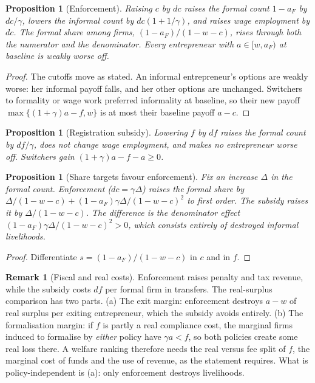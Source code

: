 \documentclass[11pt]{article}
\newtheorem{proposition}[theorem]{Proposition}
\theoremstyle{definition}
\newtheorem{remark}[theorem]{Remark}
\begin{document}
\begin{proposition}[Enforcement]\label{prop:enf}
Raising $c$ by $dc$ raises the formal count $1-a_F$ by $dc/\gamma$, lowers the informal count by $dc(1+1/\gamma)$, and raises
wage employment by $dc$. The formal share among firms, $(1-a_F)/(1-w-c)$, rises through both the numerator and the
denominator. Every entrepreneur with $a\in[w,a_F)$ at baseline is weakly worse off.
\end{proposition}
\begin{proof}
The cutoffs move as stated. An informal entrepreneur's options are weakly worse: her informal payoff falls, and her other
options are unchanged. Switchers to formality or wage work preferred informality at baseline, so their new payoff
$\max\{(1+\gamma)a-f,w\}$ is at most their baseline payoff $a-c$.
\end{proof}
\begin{proposition}[Registration subsidy]\label{prop:sub}
Lowering $f$ by $df$ raises the formal count by $df/\gamma$, does not change wage employment, and makes no entrepreneur worse
off. Switchers gain $(1+\gamma)a-f-a\ge0$.
\end{proposition}
\begin{proposition}[Share targets favour enforcement]\label{prop:share}
Fix an increase $\Delta$ in the formal count. Enforcement ($dc=\gamma\Delta$) raises the formal share by
$\Delta/(1-w-c)+(1-a_F)\gamma\Delta/(1-w-c)^2$ to first order. The subsidy raises it by $\Delta/(1-w-c)$. The difference
is the denominator effect $(1-a_F)\gamma\Delta/(1-w-c)^2>0$, which consists entirely of destroyed informal livelihoods.
\end{proposition}
\begin{proof}
Differentiate $s=(1-a_F)/(1-w-c)$ in $c$ and in $f$.
\end{proof}
\begin{remark}[Fiscal and real costs]
Enforcement raises penalty and tax revenue, while the subsidy costs $df$ per formal firm in transfers. The real-surplus
comparison has two parts. (a) The exit margin: enforcement destroys $a-w$ of real surplus per exiting entrepreneur, which
the subsidy avoids entirely. (b) The formalisation margin: if $f$ is partly a real compliance cost, the marginal firms induced
to formalise by \emph{either} policy have $\gamma a<f$, so both policies create some real loss there. A welfare ranking therefore
needs the real versus fee split of $f$, the marginal cost of funds and the use of revenue, as the statement requires. What is
policy-independent is (a): only enforcement destroys livelihoods.
\end{remark}
\end{document}
